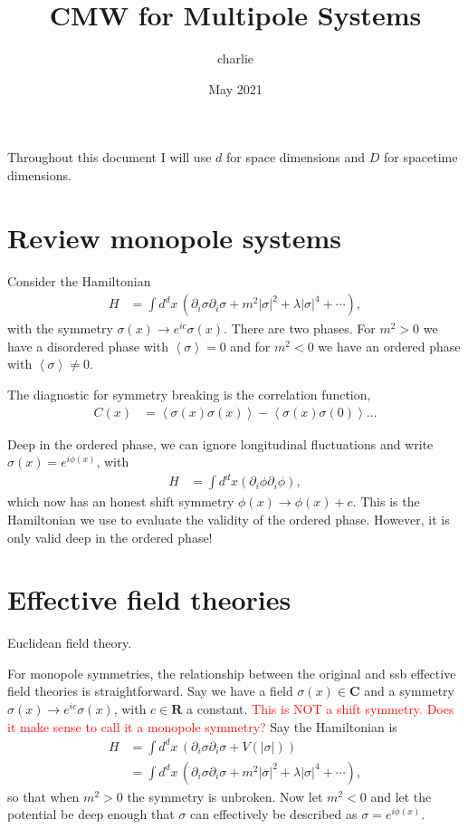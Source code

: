 \documentclass[12pt]{article}
\title{CMW for Multipole Systems}
\author{charlie}
\date{May 2021}
\newcommand{\note}[1]{\textcolor{red}{#1}}
\newcommand{\ex}[1]{\left\langle#1\right\rangle}
\newcommand{\nn}{\nonumber\\}
\newcommand{\goesto}{\rightarrow}
\begin{document}
\maketitle

Throughout this document I will use $d$ for space dimensions and $D$ for spacetime dimensions.

\section{Review monopole systems}

Consider the Hamiltonian
\begin{align}
H &= \int d^dx\, \left( \partial_i\sigma \partial_i\sigma + m^2|\sigma|^2 + \lambda|\sigma|^4 + \cdots \right),
\end{align}
with the symmetry $\sigma(x)\goesto e^{i c} \sigma(x)$. There are two phases. For $m^2>0$ we have a disordered phase with $\ex{\sigma}=0$ and for $m^2<0$ we have an ordered phase with $\ex{\sigma} \ne 0$. 

The diagnostic for symmetry breaking is the correlation function,
\begin{align}
C(x) &= \ex{\sigma(x)\sigma(x)} - \ex{\sigma(x)\sigma(0)}\dots
\end{align}

Deep in the ordered phase, we can ignore longitudinal fluctuations and write $\sigma(x) = e^{i\phi(x)}$, with
\begin{align}
H &= \int d^d x(\partial_i \phi \partial_i \phi),
\end{align}
which now has an honest shift symmetry $\phi(x)\goesto \phi(x)+c$. This is the Hamiltonian we use to evaluate the validity of the ordered phase. However, it is only valid deep in the ordered phase!

\section{Effective field theories}

Euclidean field theory.

For monopole symmetries, the relationship between the original and ssb effective field theories is straightforward. Say we have a field $\sigma(x)\in \mathbf{C}$ and a symmetry $\sigma(x)\goesto e^{i c} \sigma(x) $, with $c\in \mathbf{R}$ a constant. \note{This is NOT a shift symmetry. Does it make sense to call it a monopole symmetry?} Say the Hamiltonian is
\begin{align}
H &= \int d^dx\, \left( \partial_i\sigma \partial_i\sigma + V(|\sigma|) \right)\nn
&= \int d^dx\, \left( \partial_i\sigma \partial_i\sigma + m^2|\sigma|^2 + \lambda|\sigma|^4 + \cdots \right),
\end{align}
so that when $m^2>0$ the symmetry is unbroken. Now let $m^2<0$ and let the potential be deep enough that $\sigma$ can effectively be described as $\sigma=e^{i\phi(x)}$.
\end{document}
